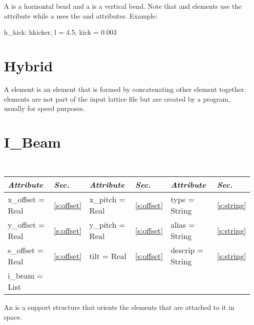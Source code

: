 A  is a horizontal bend and a  is a vertical
bend.  Note that  and  elements use the
 attribute while a  uses the  and  
attributes. Example:
\begin{example}
  h_kick: hkicker, l = 4.5, kick = 0.003
\end{example}

\section{Hybrid}
\label{s:hybrid}

A  element is an element that is formed by concatenating
other element together.  elements are not part of the input
lattice file but are created by a program, usually for speed purposes.

\section{I\_Beam}
\label{s:i_beam}

\begin{center}
\tt
\begin{tabular}{|l|l||l|l||l|l|} \hline
  {\sl Attribute} & {\sl Sec.}  & {\sl Attribute} & {\sl Sec.} & {\sl Attribute} & {\sl Sec.} \\ \hline
  x\_offset  = Real     & \ref{s:offset}  &   x\_pitch  = Real     & \ref{s:offset}  &  type = String    & \ref{s:string}  \\ \hline
  y\_offset  = Real     & \ref{s:offset}  &   y\_pitch  = Real     & \ref{s:offset}  &  alias = String   & \ref{s:string}  \\ \hline
  s\_offset  = Real     & \ref{s:offset}  &   tilt      = Real     & \ref{s:offset}  &  descrip = String & \ref{s:string}  \\ \hline
  i\_beam = List        &                 &                        &                 &                   &                 \\ \hline
\end{tabular}
\end{center}
\toffset

An  is a support structure that orients the elements that
are attached to it in space.

